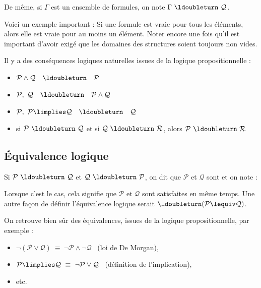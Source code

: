 \documentclass[11pt,class=report,crop=false]{standalone}
\begin{document}
De même, si $\Gamma$ est un ensemble de formules, on note $\Gamma \ \ldoubleturn \ \mathcal{Q}$.

\medskip

Voici un exemple important :
Si une formule est vraie pour tous les éléments, alors elle est vraie pour au moins un élément. Noter encore une fois qu'il est important d'avoir exigé que les domaines des structures soient toujours non vides.

Il y a des conséquences logiques naturelles issues de la logique propositionnelle :
\begin{itemize}
	\item $\mathcal{P} \land \mathcal{Q} \quad \ldoubleturn \quad \mathcal{P}$
	
	\item $\mathcal{P}, \ \mathcal{Q} \quad \ldoubleturn \quad \mathcal{P} \land \mathcal{Q}$
	
	\item $\mathcal{P}, \ \mathcal{P} \limplies \mathcal{Q} \quad \ldoubleturn \quad \mathcal{Q}$
	
	\item si $\mathcal{P} \  \ldoubleturn \  \mathcal{Q}$ et si $\mathcal{Q} \  \ldoubleturn \  \mathcal{R}$, alors $\mathcal{P} \ \ldoubleturn \  \mathcal{R}$
\end{itemize}


\subsection{Équivalence logique}

\begin{definition}
	Si $\mathcal{P} \  \ldoubleturn \ \mathcal{Q}$ et $\mathcal{Q} \ \ldoubleturn \ \mathcal{P}$, on dit que $\mathcal{P}$ et $\mathcal{Q}$ sont  et on note :
\end{definition}

Lorsque c'est le cas, cela signifie que $\mathcal{P}$ et $\mathcal{Q}$ sont satisfaites en même temps.
Une autre façon de définir l'équivalence logique serait $\ldoubleturn (\mathcal{P} \lequiv \mathcal{Q})$.


On retrouve bien sûr des équivalences, issues de la logique propositionnelle, par exemple :
\begin{itemize}
	\item $\lnot(\mathcal{P} \lor \mathcal{Q}) \  \equiv \  \lnot \mathcal{P} \land \lnot \mathcal{Q}$ \ (loi de De Morgan),
	
	\item $\mathcal{P} \limplies \mathcal{Q} \ \equiv \ \lnot \mathcal{P} \lor \mathcal{Q}$ \ (définition de l'implication),
 	
	\item etc.
\end{itemize}
\end{document}
